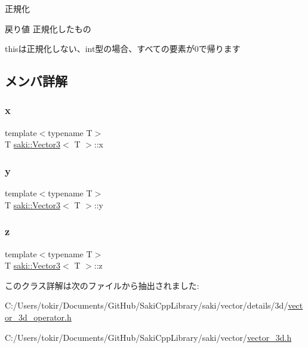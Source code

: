 正規化 

\begin{DoxyReturn}{戻り値}
正規化したもの
\end{DoxyReturn}
thisは正規化しない、int型の場合、すべての要素が0で帰ります 

\subsection{メンバ詳解}
\mbox{\label{classsaki_1_1_vector3_a1fa58e9e75dbeb650afb3db740f3131c}} 
\subsubsection{\texorpdfstring{x}{x}}
{\footnotesize\ttfamily template$<$typename T$>$ \\
T \mbox{\hyperlink{classsaki_1_1_vector3}{saki\+::\+Vector3}}$<$ T $>$\+::x}

\mbox{\label{classsaki_1_1_vector3_aba41be4543769bd023387691acf654dd}} 
\subsubsection{\texorpdfstring{y}{y}}
{\footnotesize\ttfamily template$<$typename T$>$ \\
T \mbox{\hyperlink{classsaki_1_1_vector3}{saki\+::\+Vector3}}$<$ T $>$\+::y}

\mbox{\label{classsaki_1_1_vector3_abb4ddf92f66d05e965fbd17ab3e655ff}} 
\subsubsection{\texorpdfstring{z}{z}}
{\footnotesize\ttfamily template$<$typename T$>$ \\
T \mbox{\hyperlink{classsaki_1_1_vector3}{saki\+::\+Vector3}}$<$ T $>$\+::z}



このクラス詳解は次のファイルから抽出されました\+:\begin{DoxyCompactItemize}
\item 
C\+:/\+Users/tokir/\+Documents/\+Git\+Hub/\+Saki\+Cpp\+Library/saki/vector/details/3d/\mbox{\hyperlink{vector__3d__operator_8h}{vector\+\_\+3d\+\_\+operator.\+h}}\item 
C\+:/\+Users/tokir/\+Documents/\+Git\+Hub/\+Saki\+Cpp\+Library/saki/vector/\mbox{\hyperlink{vector__3d_8h}{vector\+\_\+3d.\+h}}\end{DoxyCompactItemize}

